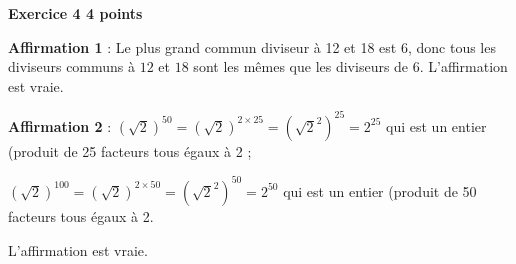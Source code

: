 \textbf{Exercice 4 \hfill 4 points}

\medskip 


 
\textbf{Affirmation 1} : %
Le plus grand commun diviseur à 12 et 18 est 6, donc tous les diviseurs communs à $12$ et $18$ sont les mêmes que les diviseurs de $6$. L'affirmation est vraie. 

\textbf{Affirmation 2} : %
$\left(\sqrt{2}\right)^{50} = \left(\sqrt{2}\right)^{2 \times 25} = \left(\sqrt{2}^2\right)^{25} = 2^{25}$ qui est un entier (produit de 25 facteurs tous égaux à 2 ;

$\left(\sqrt{2}\right)^{100} = \left(\sqrt{2}\right)^{2 \times 50} = \left(\sqrt{2}^2\right)^{50} = 2^{50}$ qui est un entier (produit de 50 facteurs tous égaux à 2.

L'affirmation est vraie.
 
\newpage

